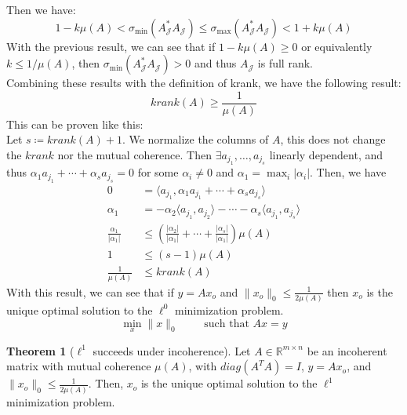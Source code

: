 \documentclass[12pt, openany]{report}
\newcommand{\R}{\mathbb{R}}
\theoremstyle{definition}
\newtheorem{thm}{Theorem}[chapter]
\begin{document}
Then we have:
\begin{equation}\label{eq:label}
	1-k \mu(A) < \sigma_{\min}(A_{\mathcal{J}}^* A_{\mathcal{J}}) \leq \sigma_{\max}(A_{\mathcal{J}}^* A_{\mathcal{J}}) < 1 + k \mu(A)
\end{equation}
With the previous result, we can see that if $1 - k \mu(A) \geq 0$ or equivalently $k \leq 1/\mu(A)$, then $\sigma_{\min}(A_{\mathcal{J}}^* A_{\mathcal{J}}) > 0$ and thus $A_{\mathcal{J}}$ is full rank.\\
Combining these results with the definition of krank, we have the following result:
\begin{equation}
	krank(A) \geq \frac{1}{\mu(A)}
\end{equation}
This can be proven like this:\\
Let $s \coloneqq krank(A) + 1$. We normalize the columns of $A$, this does not change the $krank$ nor the mutual coherence.  Then $\exists a_{j_1}, \ldots, a_{j_s}$ linearly dependent, and thus $\alpha_1 a_{j_1} + \cdots + \alpha_s a_{j_s} = 0$ for some $\alpha_i \neq 0$ and $\alpha_1 = \max_{i} |\alpha_i|$. Then, we have
\begin{equation}
	\begin{aligned}
		0 &= \langle a_{j_1}, \alpha_1 a_{j_1} + \cdots + \alpha_s a_{j_s} \rangle\\
		\alpha_1 &= - \alpha_2 \langle a_{j_1}, a_{j_2} \rangle - \cdots - \alpha_s \langle a_{j_1}, a_{j_s} \rangle\\
		\frac{\alpha_1}{|\alpha_1|} &\le \left( \frac{|\alpha_2|}{|\alpha_1|} + \cdots + \frac{|\alpha_s|}{|\alpha_1|} \right) \mu(A) \\
		1 &\leq (s-1) \mu(A)\\
		\frac{1}{\mu(A)} &\leq krank(A) 
	\end{aligned}
\end{equation}
With this result, we can see that if $y = Ax_o$ and $\|x_o\|_0 \leq \frac{1}{2 \mu(A)}$ then $x_o$ is the unique optimal solution to the $\ell^0$ minimization problem. 
\begin{equation}
	\min_x \|x\|_0 \qquad \text{ such that } Ax=y
\end{equation}
\begin{thm}[$\ell^1$ succeeds under incoherence]\label{thm:ell1_inco}
	Let $A \in \R^{m \times n}$ be an incoherent matrix with mutual coherence $\mu(A)$, with $diag(A^TA) = I$, $y = Ax_o$, and $\|x_o\|_0 \leq \frac{1}{2 \mu(A)}$. Then, $x_o$ is the unique optimal solution to the $\ell^1$ minimization problem.
\end{thm}
\end{document}
